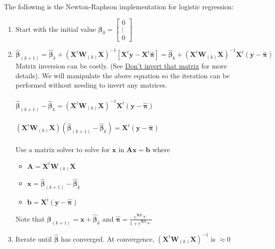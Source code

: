 \documentclass[12pt,timesnewroman,letterpaper]{article}
\begin{document}
\noindent The following is the Newton-Raphson implementation for logistic regression:
\begin{enumerate}
    \item Start with the initial value $\boldsymbol{\beta}_0 = \begin{bmatrix} 
    0 \\
    \vdots \\
    0
    \end{bmatrix}$
    \item $\boldsymbol{\hat{\beta}}_{(k+1)} = \boldsymbol{\hat{\beta}}_{k} + (\boldsymbol{X}^t \boldsymbol{W}_{(k)} \boldsymbol{X})^{-1}[\boldsymbol{X}^t\boldsymbol{y} - \boldsymbol{X}^t\boldsymbol{\hat{\pi}}] = \boldsymbol{\hat{\beta}}_{k} + (\boldsymbol{X}^t \boldsymbol{W}_{(k)} \boldsymbol{X})^{-1}\boldsymbol{X}^t(\boldsymbol{y - \hat{\pi}})$
    \\
    Matrix inversion can be costly. (See \href{https://www.johndcook.com/blog/2010/01/19/dont-invert-that-matrix/}{Don't invert that matrix} for more details). We will manipulate the above equation so the iteration can be performed without needing to invert any matrices.
    \\\\
    $\boldsymbol{\hat{\beta}}_{(k+1)} - \boldsymbol{\hat{\beta}}_{k} = (\boldsymbol{X}^t \boldsymbol{W}_{(k)} \boldsymbol{X})^{-1}\boldsymbol{X}^t(\boldsymbol{y - \hat{\pi}})$
    \\\\
    $(\boldsymbol{X}^t \boldsymbol{W}_{(k)} \boldsymbol{X})(\boldsymbol{\hat{\beta}}_{(k+1)} - \boldsymbol{\hat{\beta}}_{k}) = \boldsymbol{X}^t(\boldsymbol{y - \hat{\pi}})$
    \\\\
    Use a matrix solver to solve for $\boldsymbol{x}$ in $\boldsymbol{Ax} = \boldsymbol{b}$ where 
    \begin{itemize}
    \item $\boldsymbol{A} = \boldsymbol{X}^t \boldsymbol{W}_{(k)} \boldsymbol{X}$
    \item $\boldsymbol{x} = \boldsymbol{\hat{\beta}}_{(k+1)} - \boldsymbol{\hat{\beta}}_{k}$
    \item $\boldsymbol{b} = \boldsymbol{X}^t(\boldsymbol{y - \hat{\pi}})$
    \end{itemize}
    
    Note that $\boldsymbol{\beta}_{(k+1)} = \boldsymbol{x} + \boldsymbol{\hat{\beta}}_{k}$ and $\boldsymbol{\hat{\pi}} = \frac{e^{\boldsymbol{X\beta_{(k)}}}}{1 + e^{\boldsymbol{X\beta_{(k)}}}}$
    
    \item Iterate until $\boldsymbol{\hat{\beta}}$ has converged. At convergence, $(\boldsymbol{X}^t \boldsymbol{W}_{(k)} \boldsymbol{X})^{-1}$ is $\approx 0$
\end{enumerate}
\end{document}

